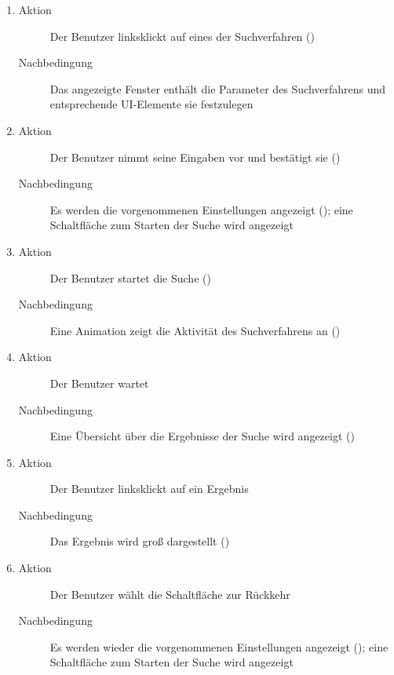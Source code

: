 \begin{description}
\begin{enumerate}
\begin{description}
		\end{description}
		\item
		\begin{description}
			\item[Aktion] Der Benutzer linksklickt auf eines der Suchverfahren ()
			\item[Nachbedingung] Das angezeigte Fenster enthält die Parameter des Suchverfahrens und entsprechende UI-Elemente sie festzulegen
		\end{description}
		\item
		\begin{description}
			\item[Aktion] Der Benutzer nimmt seine Eingaben vor und bestätigt sie ()
			\item[Nachbedingung] Es werden die vorgenommenen Einstellungen angezeigt (); eine Schaltfläche zum Starten der Suche wird angezeigt
		\end{description}
		\item
		\begin{description}
			\item[Aktion] Der Benutzer startet die Suche ()
			\item[Nachbedingung] Eine Animation zeigt die Aktivität des Suchverfahrens an ()
		\end{description}
		\item
		\begin{description}
			\item[Aktion] Der Benutzer wartet
			\item[Nachbedingung] Eine Übersicht über die Ergebnisse der Suche wird angezeigt ()
		\end{description}
		\item
		\begin{description}
			\item[Aktion] Der Benutzer linksklickt auf ein Ergebnis
			\item[Nachbedingung] Das Ergebnis wird groß dargestellt ()
		\end{description}
		\item
		\begin{description}
			\item[Aktion] Der Benutzer wählt die Schaltfläche zur Rückkehr
			\item[Nachbedingung] Es werden wieder die vorgenommenen Einstellungen angezeigt (); eine Schaltfläche zum Starten der Suche wird angezeigt
		\end{description}

\end{enumerate}
\end{description}
